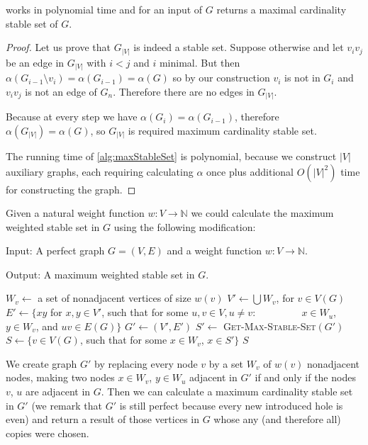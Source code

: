 \begin{theorem}
   works in polynomial time and for an input of $G$ returns a maximal cardinality stable set of $G$.
\end{theorem}
\begin{proof}
  Let us prove that $G_{|V|}$ is indeed a stable set. Suppose otherwise and let $v_iv_j$ be an edge in $G_{|V|}$ with $i < j$ and $i$ minimal. But then $\alpha(G_{i-1} \setminus v_i) = \alpha(G_{i-1}) = \alpha(G)$ so by our construction $v_i$ is not in $G_i$ and $v_iv_j$ is not an edge of $G_n$. Therefore there are no edges in $G_{|V|}$.

  Because at every step we have $\alpha(G_i) = \alpha(G_{i-1})$, therefore $\alpha(G_{|V|}) = \alpha(G)$, so $G_{|V|}$ is required maximum cardinality stable set.
  
  The running time of \cref{alg:maxStableSet} is polynomial, because we construct $|V|$ auxiliary graphs, each requiring calculating $\alpha$ once plus additional $O(|V|^2)$ time for constructing the graph.
\end{proof}

Given a natural weight function $w : V \rightarrow \mathbb{N}$ we could calculate the maximum weighted stable set in $G$ using the following modification: 

\begin{alg}
  \label{alg:maxWeightedStableSet}
  Input: A perfect graph $G = (V, E)$ and a weight function $w : V \rightarrow \mathbb{N}$.

  \noindent Output: A maximum weighted stable set in $G$.
\end{alg}

\begin{algorithmic}[1]
    \ls $W_v \gets$ a set of nonadjacent vertices of size $w(v)$
  \mEndFor
  \ls $V' \gets \bigcup W_v$, for $v \in V(G)$ 
  \ls $E' \gets \{xy$ for $x, y \in V'$, such that for some $u, v \in V, u \neq v$:
  \lsx~~~~~~~~ $x \in W_u$, $y \in W_v$, and $uv \in E(G)\}$
  \ls $G' \gets (V', E')$
  \ls $S' \gets$ \textsc{Get-Max-Stable-Set$(G')$}
  \ls $S \gets \{v \in V(G)$, such that for some $x\in W_v$, $x \in S'\}$
  \ls \RETURN $S$
  \mEndProcedure
\end{algorithmic}

We create graph $G'$ by replacing every node $v$ by a set $W_v$ of $w(v)$ nonadjacent nodes, making two nodes $x \in W_v$, $y \in W_u$ adjacent in $G'$ if and only if the nodes $v$, $u$ are adjacent in $G$. Then we can calculate a maximum cardinality stable set in $G'$ (we remark that $G'$ is still perfect because every new introduced hole is even) and return a result of those vertices in $G$ whose any (and therefore all) copies were chosen.

